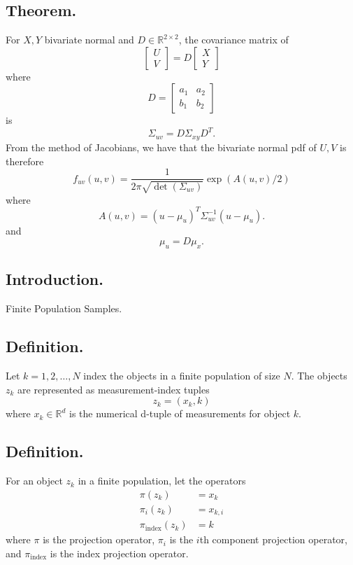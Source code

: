 \documentclass[titlepage]{article}
\begin{document}
\subsection{Theorem.} For $X,Y$ bivariate normal and $D \in \mathbb{R}^{2 \times 2}$, the covariance matrix of 
$$\begin{bmatrix} U \\ V \end{bmatrix} = D\begin{bmatrix} X \\ Y \end{bmatrix}$$
where 
$$D = \begin{bmatrix} a_{1} & a_{2} \\ b_{1} & b_{2} \end{bmatrix}$$
is 
$$\Sigma_{uv} = D\Sigma_{xy}D^{T}.$$
From the method of Jacobians, we have that the bivariate normal pdf of $U,V$ is therefore 
$$f_{uv}(u, v) = \frac{1}{2\pi\sqrt{\det(\Sigma_{uv})}}\exp\left(A(u, v)/2\right)$$
where 
$$A(u, v) = (u - \mu_{u})^{T}\Sigma_{uv}^{-1}(u - \mu_{u}).$$
and
$$\mu_{u} = D\mu_{x}.$$

\newpage {}

\subsection{Introduction.} Finite Population Samples.

\subsection{Definition.} Let $k = 1, 2, \ldots, N$ index the objects in a finite population of size $N$. The objects $z_{k}$ are represented as measurement-index tuples 
$$z_{k} = (x_{k}, k)$$
where $x_{k} \in \mathbb{R}^{d}$ is the numerical d-tuple of measurements for object $k$.

\subsection{Definition.} For an object $z_{k}$ in a finite population, let the operators 
\begin{align*}
                   \pi(z_{k}) &= x_{k} \\
               \pi_{i}(z_{k}) &= x_{k,i} \\
    \pi_{\text{index}}(z_{k}) &= k
\end{align*}
where $\pi$ is the projection operator, $\pi_{i}$ is the $i$th component projection operator, and $\pi_{\text{index}}$ is the index projection operator.
\end{document}
